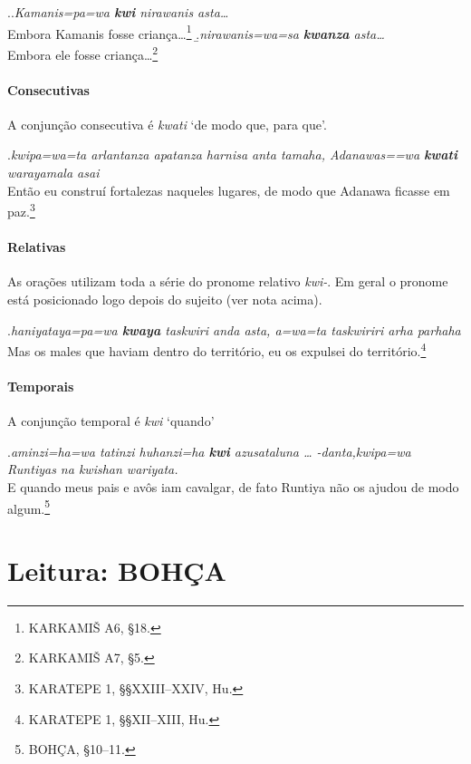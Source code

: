 \ex.\a.\emph{Kamanis=pa=wa \textbf{kwi} nirawanis asta\ldots{}}\\
Embora Kamanis fosse criança\ldots{}\footnote{KARKAMIŠ A6, §18.}
\b.\emph{nirawanis=wa=sa \textbf{kwanza} asta\ldots{}}\\
Embora ele fosse criança\ldots{}\footnote{KARKAMIŠ A7, §5.}


\paragraph{Consecutivas}
A conjunção consecutiva é \emph{kwati} `de modo que, para que'.

\ex.\emph{kwipa=wa=ta arlantanza apatanza harnisa anta tamaha,
	Adanawas=\linebreak=wa
	\textbf{kwa\-ti} warayamala asai}\\
Então eu construí fortalezas naqueles lugares, de modo que Adanawa\linebreak
ficasse em paz.\footnote{KARATEPE 1, §§XXIII--XXIV, Hu.}

\paragraph{Relativas}
As orações utilizam toda a série do pronome relativo \emph{kwi-}.
Em geral o pronome está posicionado logo depois do sujeito (ver nota acima).

\ex.\emph{haniyataya=pa=wa \textbf{kwaya} taskwiri anda asta, a=wa=ta
	taskwiriri arha par\-haha}\\
Mas os males que haviam dentro do território, eu os expulsei do
território.\footnote{KARATEPE 1, §§XII--XIII, Hu.}

\paragraph{Temporais}
A conjunção temporal é \emph{kwi} `quando'

\ex.\emph{aminzi=ha=wa tatinzi huhanzi=ha \textbf{kwi} azusataluna {\ldots}
	-danta,\linebreak kwipa=wa Runtiyas na
	kwishan wariyata.}\\
E quando meus pais e avôs iam cavalgar, de fato Runtiya não
os ajudou de modo algum.\footnote{BOHÇA, §10--11.}

\clearpage



\section{Leitura: BOHÇA}


